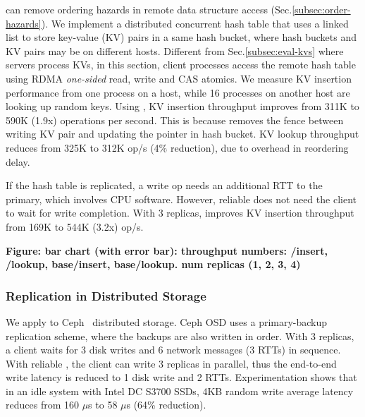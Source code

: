 \sys{} can remove ordering hazards in remote data structure access (Sec.\ref{subsec:order-hazards}).
We implement a distributed concurrent hash table that uses a linked list to store key-value (KV) pairs in a same hash bucket, where hash buckets and KV pairs may be on different hosts.
Different from Sec.\ref{subsec:eval-kvs} where servers process KVs, in this section, client processes access the remote hash table using RDMA \emph{one-sided} read, write and CAS atomics.
We measure KV insertion performance from one process on a host, while 16 processes on another host are looking up random keys.
Using \sys{}, KV insertion throughput improves from 311K to 590K (1.9x) operations per second.
This is because \sys{} removes the fence between writing KV pair and updating the pointer in hash bucket.
KV lookup throughput reduces from 325K to 312K op/s (4\% reduction), due to overhead in reordering delay.

If the hash table is replicated, a write op needs an additional RTT to the primary, which involves CPU software. However, reliable \sys{} does not need the client to wait for write completion.
With 3 replicas, \sys{} improves KV insertion throughput from 169K to 544K (3.2x) op/s.

\textbf{Figure: bar chart (with error bar): throughput numbers: \sys{}/insert, \sys{}/lookup, base/insert, base/lookup. num replicas (1, 2, 3, 4)}


\subsubsection{Replication in Distributed Storage}
\label{subsec:ceph}

We apply \sys{} to Ceph~\cite{weil2006ceph} distributed storage. Ceph OSD uses a primary-backup replication scheme, where the backups are also written in order. With 3 replicas, a client waits for 3 disk writes and 6 network messages (3 RTTs) in sequence. With reliable \sys{}, the client can write 3 replicas in parallel, thus the end-to-end write latency is reduced to 1 disk write and 2 RTTs. Experimentation shows that in an idle system with Intel DC S3700 SSDs, 4KB random write average latency reduces from 160 $\mu$s to 58 $\mu$s (64\% reduction).




